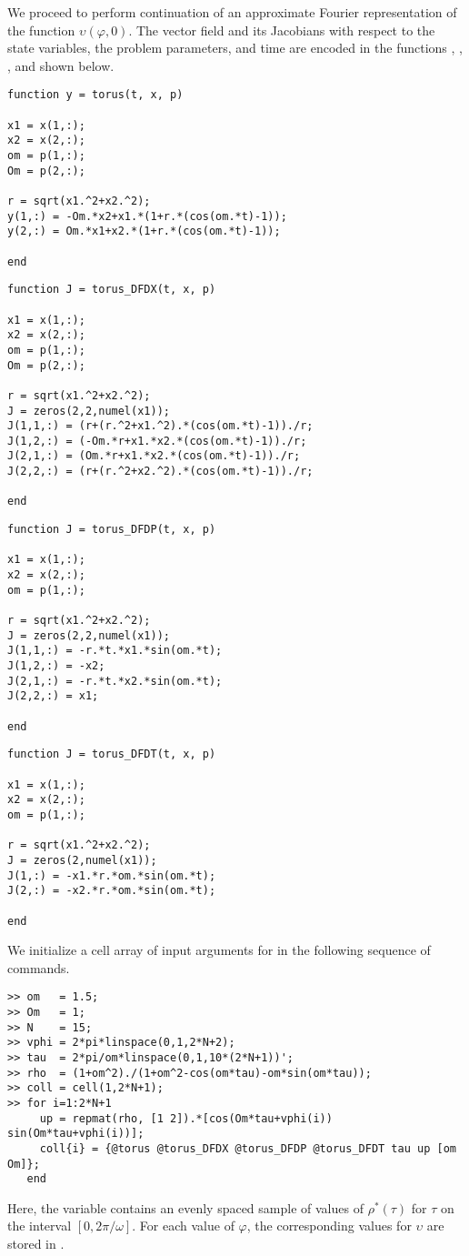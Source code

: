 We proceed to perform continuation of an approximate Fourier representation of the function $\upsilon(\varphi,0)$. The vector field and its Jacobians with respect to the state variables, the problem parameters, and time are encoded in the functions , , , and  shown below.
\begin{lstlisting}[language=coco-highlight]
function y = torus(t, x, p)

x1 = x(1,:);
x2 = x(2,:);
om = p(1,:);
Om = p(2,:);

r = sqrt(x1.^2+x2.^2);
y(1,:) = -Om.*x2+x1.*(1+r.*(cos(om.*t)-1));
y(2,:) = Om.*x1+x2.*(1+r.*(cos(om.*t)-1));

end
\end{lstlisting}
\begin{lstlisting}[language=coco-highlight]
function J = torus_DFDX(t, x, p)

x1 = x(1,:);
x2 = x(2,:);
om = p(1,:);
Om = p(2,:);

r = sqrt(x1.^2+x2.^2);
J = zeros(2,2,numel(x1));
J(1,1,:) = (r+(r.^2+x1.^2).*(cos(om.*t)-1))./r;
J(1,2,:) = (-Om.*r+x1.*x2.*(cos(om.*t)-1))./r;
J(2,1,:) = (Om.*r+x1.*x2.*(cos(om.*t)-1))./r;
J(2,2,:) = (r+(r.^2+x2.^2).*(cos(om.*t)-1))./r;

end

\end{lstlisting}
\begin{lstlisting}[language=coco-highlight]
function J = torus_DFDP(t, x, p)

x1 = x(1,:);
x2 = x(2,:);
om = p(1,:);

r = sqrt(x1.^2+x2.^2);
J = zeros(2,2,numel(x1));
J(1,1,:) = -r.*t.*x1.*sin(om.*t);
J(1,2,:) = -x2;
J(2,1,:) = -r.*t.*x2.*sin(om.*t);
J(2,2,:) = x1;

end

\end{lstlisting}
\begin{lstlisting}[language=coco-highlight]
function J = torus_DFDT(t, x, p)

x1 = x(1,:);
x2 = x(2,:);
om = p(1,:);

r = sqrt(x1.^2+x2.^2);
J = zeros(2,numel(x1));
J(1,:) = -x1.*r.*om.*sin(om.*t);
J(2,:) = -x2.*r.*om.*sin(om.*t);

end
\end{lstlisting}
We initialize a cell array of input arguments for  in the following sequence of commands.
\begin{lstlisting}[language=coco-highlight]
>> om   = 1.5;
>> Om   = 1;
>> N    = 15;
>> vphi = 2*pi*linspace(0,1,2*N+2);
>> tau  = 2*pi/om*linspace(0,1,10*(2*N+1))';
>> rho  = (1+om^2)./(1+om^2-cos(om*tau)-om*sin(om*tau));
>> coll = cell(1,2*N+1);
>> for i=1:2*N+1
     up = repmat(rho, [1 2]).*[cos(Om*tau+vphi(i)) sin(Om*tau+vphi(i))];
     coll{i} = {@torus @torus_DFDX @torus_DFDP @torus_DFDT tau up [om Om]};
   end
\end{lstlisting}
Here, the variable  contains an evenly spaced sample of values of $\rho^\ast(\tau)$ for $\tau$ on the interval $[0,2\pi/\omega]$. For each value of $\varphi$, the corresponding values for $\upsilon$ are stored in .

